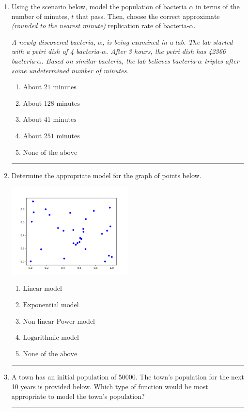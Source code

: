 \documentclass[14pt]{extbook}
\newcommand{\litem}[1]{\item#1\hspace*{-1cm}\rule{\textwidth}{0.4pt}}
\begin{document}
\begin{enumerate}
{\begin{enumerate}[label=\Alph*.]
\end{enumerate} }
\litem{
Using the scenario below, model the population of bacteria $\alpha$ in terms of the number of minutes, $t$ that pass. Then, choose the correct approximate \textit{(rounded to the nearest minute)} replication rate of bacteria-$\alpha$.
\begin{center}
    \textit{ A newly discovered bacteria, $\alpha$, is being examined in a lab. The lab started with a petri dish of 4 bacteria-$\alpha$. After 3 hours, the petri dish has 42366 bacteria-$\alpha$. Based on similar bacteria, the lab believes bacteria-$\alpha$ triples after some undetermined number of minutes. }
\end{center}
\begin{enumerate}[label=\Alph*.]
\item \( \text{About } 21 \text{ minutes} \)
\item \( \text{About } 128 \text{ minutes} \)
\item \( \text{About } 41 \text{ minutes} \)
\item \( \text{About } 251 \text{ minutes} \)
\item \( \text{None of the above} \)

\end{enumerate} }
\litem{
Determine the appropriate model for the graph of points below.
\begin{center}
    \includegraphics[width=0.5\textwidth]{../Figures/identifyModelGraph11CopyA.png}
\end{center}
\begin{enumerate}[label=\Alph*.]
\item \( \text{Linear model} \)
\item \( \text{Exponential model} \)
\item \( \text{Non-linear Power model} \)
\item \( \text{Logarithmic model} \)
\item \( \text{None of the above} \)

\end{enumerate} }
\litem{
A town has an initial population of 50000. The town's population for the next 10 years is provided below. Which type of function would be most appropriate to model the town's population?

}
\end{enumerate}
\end{document}
